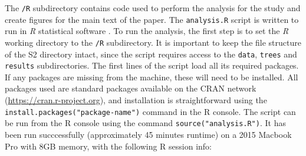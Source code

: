 The \texttt{/R} subdirectory contains code used to perform the analysis
for the study and create figures for the main text of the paper. The
\texttt{analysis.R} script is written to run in \emph{R} statistical
software \autocite{r_core_team_r_2017}. To run the analysis, the first
step is to set the \emph{R} working directory to the \texttt{/R}
subdirectory. It is important to keep the file structure of the S2
directory intact, since the script requires access to the \texttt{data},
\texttt{trees} and \texttt{results} subdirectories. The first lines of
the script load all its required packages. If any packages are missing
from the machine, these will need to be installed. All packages used are
standard packages available on the CRAN network
(\url{https://cran.r-project.org}), and installation is straightforward
using the \texttt{install.packages("package-name")} command in the R
console. The script can be run from the R console using the command
\texttt{source("analysis.R")}. It has been run succcessfully
(approximately 45 minutes runtime) on a 2015 Macbook Pro with 8GB
memory, with the following R session info:

